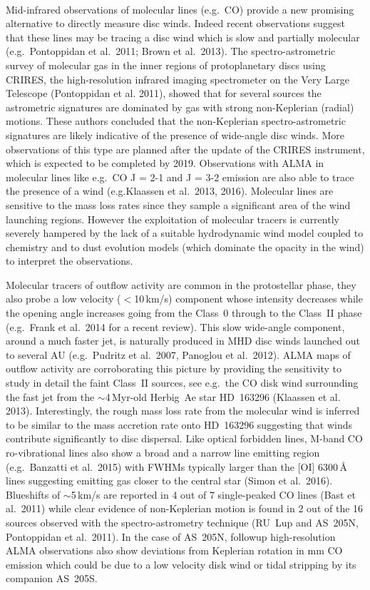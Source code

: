 \documentclass[10pt,fleqn,twoside]{article}
\begin{document}
\vspace{0.5em}{\Tcol\bf Molecular species}\\
Mid-infrared observations of molecular lines (e.g.\ CO) provide a new
promising alternative to directly measure disc winds. Indeed recent
observations suggest that these lines may be tracing a disc wind which
is slow and partially molecular (e.g.\ Pontoppidan et al.\ 2011; Brown et al.\ 2013). 
The spectro-astrometric survey of molecular gas in the inner regions of
protoplanetary discs using CRIRES, the high-resolution infrared
imaging spectrometer on the Very Large Telescope (Pontoppidan et
al. 2011), showed that for several sources the astrometric signatures
are dominated by gas with strong non-Keplerian (radial) motions. These
authors concluded that the non-Keplerian spectro-astrometric
signatures are likely indicative of the presence of wide-angle disc
winds. 
More observations of this type are planned after the update of
the CRIRES instrument, which is expected to be completed by
2019. Observations with ALMA in molecular lines like e.g.\ CO J = 2-1
and J = 3-2 emission are also able to trace the presence of a wind (e.g.Klaassen et al.\ 2013, 2016).  
Molecular lines are sensitive to the mass loss rates since they
sample a significant area of the wind launching regions. However the
exploitation of molecular tracers is currently severely hampered by
the lack of a suitable hydrodynamic wind model coupled to chemistry
and to dust evolution models (which dominate the opacity in the wind)
to interpret the observations.

Molecular tracers of outflow activity are common in the protostellar
phase, they also probe a low velocity ($<$10\,km/s) component whose
intensity decreases while the opening angle increases going from the
Class~0 through to the Class~II phase (e.g.\ Frank et al.\ 2014 for a
recent review). This slow wide-angle component, around a much faster
jet, is naturally produced in MHD disc winds launched out to several
AU (e.g.\ Pudritz et al.\ 2007, Panoglou et al.\ 2012). ALMA maps of
outflow activity are corroborating this picture by providing the
sensitivity to study in detail the faint Class~II sources, see
e.g.\ the CO disk wind surrounding the fast jet from the
$\sim$4\,Myr-old Herbig~Ae star HD~163296 (Klaassen et
al. 2013). Interestingly, the rough mass loss rate from the molecular
wind is inferred to be similar to the mass accretion rate onto
HD~163296 suggesting that winds contribute significantly to disc
dispersal. Like optical forbidden lines, M-band CO ro-vibrational
lines also show a broad and a narrow line emitting region
(e.g.\ Banzatti et al.\ 2015) with FWHMs typically larger than the [OI]
6300\,\AA{} lines suggesting emitting gas closer to the central star
(Simon et al.\ 2016). Blueshifts of $\sim$5\,km/s are reported in 4 out
of  7 single-peaked CO lines (Bast et al.\ 2011) while clear evidence
of non-Keplerian motion is found in 2 out of the 16 sources observed
with the spectro-astrometry technique (RU~Lup and AS~205N, Pontoppidan
et al.\ 2011). In the case of AS~205N, followup high-resolution ALMA
observations also show deviations from Keplerian rotation in mm CO
emission which could be due to a low velocity disk wind or tidal
stripping by its companion AS~205S. 
\end{document}
